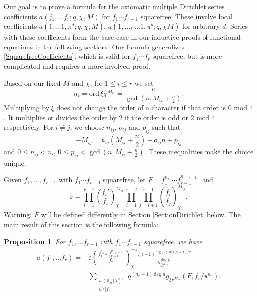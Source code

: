 \documentclass[11pt,letterpaper]{article}
\newtheorem{prop}[theorem]{Proposition}
\theoremstyle{definition}
\theoremstyle{remark}
\numberwithin{equation}{section}
\theoremstyle{dotless}
\newcommand{\F}{\mathbb{F}}
\newcommand{\ord}{\mathrm{ord} \,}
\newcommand{\res}[2]{\left(\frac{#1}{#2}\right)}
\begin{document}
Our goal is to prove a formula for the axiomatic multiple Dirichlet series coefficients $a(f_1, \ldots f_r; q, \chi, M)$ for $f_1\cdots f_{r-1}$ squarefree. These involve local coefficients $a(1, \ldots 1, \pi^d; q, \chi, M)$, $a(1, \ldots \pi \ldots 1, \pi^d; q, \chi M)$ for arbitrary $d$. Series with these coefficients form the base case in our inductive proofs of functional equations in the following sections. Our formula generalizes \eqref{SquarefreeCoefficients}, which is valid for $f_1\cdots f_r$ squarefree, but is more complicated and requires a more involved proof. 

Based on our fixed $M$ and $\chi$, for $1 \leq i \leq r$ we set 
\begin{equation} \label{ni}
n_i= \ord \xi \chi^{M_{ii}}=\frac{n}{\gcd(n, M_{ii}+\frac{n}{2})} .
\end{equation} 
Multiplying by $\xi$ does not change the order of a character if that order is $0$ mod $4$. It multiplies or divides the order by $2$ if the order is odd or $2$ mod $4$ respectively. For $i \neq j$, we choose $n_{ij}$, $o_{ij}$ and $p_{ij}$ such that 
\begin{equation}\label{nij}
-M_{ij} = n_{ij}(M_{ii} + \frac{n}{2}) +o_{ij}n+p_{ij}
\end{equation}
and $0 \leq n_{ij} < n_i$, $0 \leq p_{ij} <  \gcd(n, M_{ii}+\frac{n}{2})$. These inequalities make the choice unique.  

Given $f_1, \ldots ,f_{r-1}$ with $f_1\cdots f_{r-1}$ squarefree, let $F=f_1^{n_{r1}}\cdots f_{r-1}^{n_{r \, (r-1)}}$ and
\begin{equation} \label{GlobalRoot}
\varepsilon = \prod_{i=1}^{r-1} \res{f_i'}{f_i}_{\chi}^{M_{ii}} \, \prod_{i=1}^{r-2}\prod_{j=i+1}^{r-1} \res{f_i}{f_j}_{\chi}^{M_{ij}}.
\end{equation}
Warning: $F$ will be defined differently in Section \ref{SectionDirichlet} below. The main result of this section is the following formula:

\begin{prop} \label{PropCoeff4}
For $f_1, \ldots f_{r-1}$ with $f_1\cdots f_{r-1}$ squarefree, we have
\begin{equation} \label{Coeff4}
\begin{split}
a(f_1, \ldots f_r) =& \varepsilon \res{f_1^{p_{r1}}\cdots f_{r-1}^{p_{r \, (r-1)}}}{f_r}_{\chi}^{-1}  \frac{\xi(-1)^{\deg f_r(\deg f_r -1)/2}}{g_{\xi \chi^{M_{rr}}}^{\deg f_r}} \\ &\sum_{\substack{u \in \F_q[T]^+ \\ u^{n_r}|f_r}} q^{(n_r-1)\deg u} g_{\xi \chi^{M_{rr}}}(F, f_r/u^{n_r}).
\end{split}
\end{equation}
\end{prop}
\end{document}
